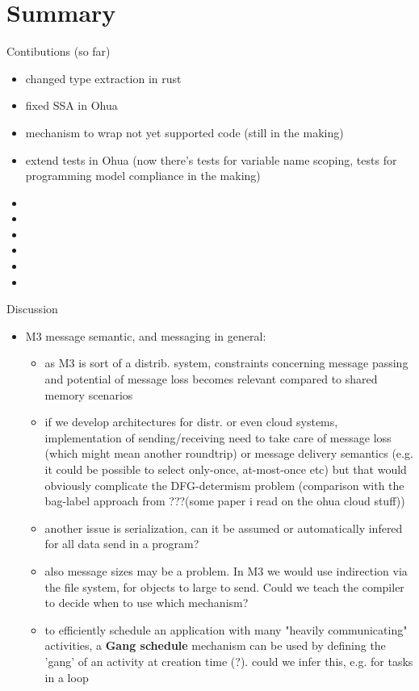 \section{Summary}

Contibutions (so far)
\begin{itemize}
    \item changed type extraction in rust
    \item fixed SSA in Ohua
    \item mechanism to wrap not yet supported code (still in the making)
    \item extend tests in Ohua (now there's tests for variable name scoping, tests for programming model compliance in the making)
    \item {}
    \item {}
    \item {}
    \item {}
    \item {}
    \item {}
\end{itemize}




Discussion
\begin{itemize}
    \item M3 message semantic, and messaging in general:
    \begin{itemize}
        \item as M3 is sort of a distrib. system, constraints concerning message passing and potential of message loss becomes relevant compared to shared memory scenarios
        \item if we develop architectures for distr. or even cloud systems, implementation of sending/receiving need to take care of message loss (which might mean another roundtrip) or message delivery semantics (e.g. it could be possible to select only-once, at-most-once etc) but that would obviously complicate the DFG-determism problem 
        (comparison with the bag-label approach from ???(some paper i read on the ohua cloud stuff))
        \item another issue is serialization, can it be assumed or automatically infered for all data send in a program?
        \item also message sizes may be a problem. In M3 we would use indirection via the file system, for objects to large to send. Could we teach the compiler to decide when to use which mechanism?
        \item to efficiently schedule an application with many "heavily communicating" activities, a \textbf{Gang schedule} mechanism can be used  by defining the 'gang' of an activity at creation time (?). \means could we infer this, e.g. for tasks in a loop
    \end{itemize}
\end{itemize}

